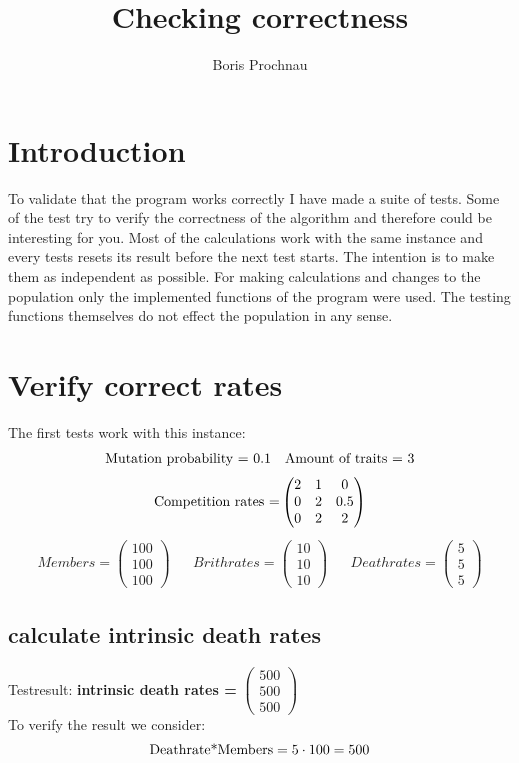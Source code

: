 \documentclass{article}
\title{Checking correctness}
\author{Boris Prochnau}
\newcommand{\vect}[3]{\ensuremath{\begin{pmatrix}	#1 \\ #2 \\ #3	\end{pmatrix}}}
\begin{document}
\maketitle
\tableofcontents
\newpage
\section*{Introduction}
To validate that the program works correctly I have made a suite of tests. Some of the test try to verify the correctness of the algorithm and therefore could be interesting for you.
Most of the calculations work with the same instance and every tests resets its result before the next test starts. The intention is to make them as independent as possible. For making calculations and changes to the population only the implemented functions of the program were used. The testing functions themselves do not effect the population in any sense. 

\section{Verify correct rates}
The first tests work with this instance:
\begin{align*}
\textnormal{Mutation probability = 0.1}
&&\textnormal{Amount of traits = 3}
\end{align*}
\[\textnormal{Competition rates =} 
\begin{pmatrix}	2 & 1 & 0 \\ 0 & 2 & 0.5  \\ 0 & 2 & 2 \end{pmatrix}\]
\begin{align*}
	Members = \begin{pmatrix}	100 \\ 100 \\ 100	\end{pmatrix} && Brithrates = \begin{pmatrix}	10 \\ 10 \\ 10	\end{pmatrix} && Deathrates = \begin{pmatrix}	5 \\ 5 \\ 5	\end{pmatrix}
\end{align*}

\subsection{calculate intrinsic death rates}
Testresult: \textbf{intrinsic death rates = } \vect{500}{500}{500}\\
To verify the result we consider:
\[\textnormal{Deathrate*Members}= 5 \cdot 100 = 500\]
\end{document}
